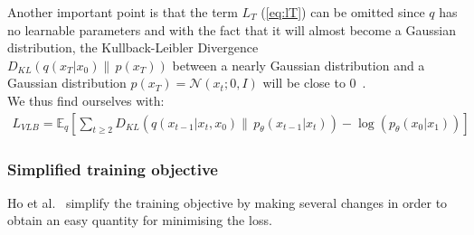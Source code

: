 \documentclass[twoside]{article}
\numberwithin{equation}{section}
\numberwithin{figure}{section}
\begin{document}
Another important point is that the term $L_T$ (\ref{eq:lT}) can be omitted since $q$ has no learnable parameters and with the fact that it will almost become a Gaussian distribution, the Kullback-Leibler Divergence \\
$D_{KL}\left(q\left(x_T | x_0\right) \| \, p\left(x_T\right)\right)$ between a nearly Gaussian distribution and a Gaussian distribution $p\left(x_T\right) = \mathcal{N}\left(x_t; 0, I\right)$ will be close to 0~\cite{ho2020denoising}. \\
We thus find ourselves with:
\begin{gather}
  L_{VLB} = \mathbb{E}_q \left[ \sum_{t \geq 2} D_{KL}\left(q\left(x_{t-1} | x_t, x_0\right) \| \, p_{\theta}\left(x_{t-1} | x_t\right)\right) - \log\left(p_{\theta}\left(x_0 | x_1\right)\right) \right]
\end{gather}

\subsubsection{Simplified training objective}

Ho et al.~\cite{ho2020denoising} simplify the training objective by making several changes in order to obtain an easy quantity for minimising the loss. 
\end{document}
